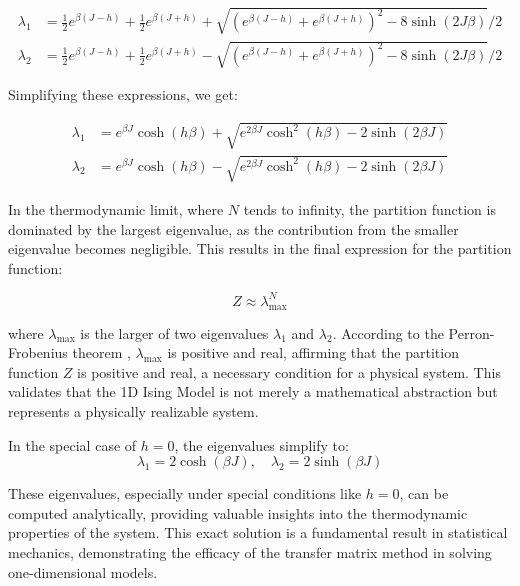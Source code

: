 \begin{align}
  \lambda_1 &= \frac{1}{2}e^{\beta (J - h)} + \frac{1}{2}e^{\beta (J + h)} + \sqrt{(e^{\beta (J - h)} + e^{\beta (J + h)})^2 - 8 \sinh(2 J \beta)}/2 \\
  \lambda_2 &= \frac{1}{2}e^{\beta (J - h)} + \frac{1}{2}e^{\beta (J + h)} -\sqrt{(e^{\beta (J - h)} + e^{\beta (J + h)})^2 - 8 \sinh(2 J \beta)}/2  
\end{align}

Simplifying these expressions, we get:

\begin{align}
  \lambda_1 &= e^{\beta J} \cosh(h\beta) + \sqrt{e^{2\beta J} \cosh^2(h\beta) - 2 \sinh(2\beta J)} \\
  \lambda_2 &= e^{\beta J} \cosh(h\beta) - \sqrt{e^{2\beta J} \cosh^2(h\beta) - 2 \sinh(2\beta J)}
\end{align}

In the thermodynamic limit, where \( N \) tends to infinity, the partition
function is dominated by the largest eigenvalue, as the contribution from the
smaller eigenvalue becomes negligible. This results in the final expression for
the partition function:

\begin{equation}
Z \approx \lambda_{\text{max}}^N
\label{eq:partitionmax}
\end{equation}

where \( \lambda_{\text{max}} \) is the larger of two eigenvalues \( \lambda_1
\) and \( \lambda_2 \). According to the Perron-Frobenius theorem
\cite{Pillai2005}, \( \lambda_{\text{max}} \) is positive and real, affirming
that the partition function \( Z \) is positive and real, a necessary condition
for a physical system. This validates that the 1D Ising Model is not merely a
mathematical abstraction but represents a physically realizable system.

In the special case of \( h = 0 \), the eigenvalues simplify to:
\begin{equation}
 \lambda_1 = 2 \cosh(\beta J), \quad \lambda_2 = 2 \sinh(\beta J)
 \label{eq:eigenvalues}
\end{equation}

These eigenvalues, especially under special conditions like \( h = 0 \), can be
computed analytically, providing valuable insights into the thermodynamic
properties of the system. This exact solution is a fundamental result in
statistical mechanics, demonstrating the efficacy of the transfer matrix method
in solving one-dimensional models.

